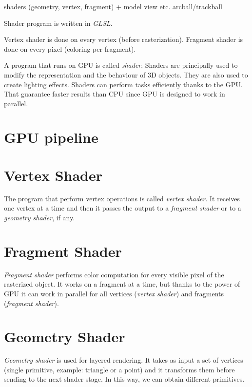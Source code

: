 shaders (geometry, vertex, fragment) + model view etc.
arcball/trackball

Shader program is written in \textit{GLSL}.

Vertex shader is done on every vertex (before rasterization).
Fragment shader is done on every pixel (coloring per fragment).

A program that runs on GPU is called \textit{shader}. Shaders are principally used to modify the representation and the behaviour of 3D objects. They are also used to create lighting effects.  Shaders can perform tasks efficiently thanks to the GPU. That guarantee faster results than CPU since GPU is designed to work in parallel.

\section{GPU pipeline}


\section{Vertex Shader}
The program that perform vertex operations is called \textit{vertex shader}. It receives one vertex at a time and then it passes the output to a \textit{fragment shader} or to a \textit{geometry shader}, if any.

\section{Fragment Shader}
\textit{Fragment shader} performs color computation for every visible pixel of the rasterized object. It works on a fragment at a time, but thanks to the power of GPU it can work in parallel for all vertices (\textit{vertex shader}) and fragments (\textit{fragment shader}).

\section{Geometry Shader}
\textit{Geometry shader} is used for layered rendering. It takes as input a set of vertices (single primitive, example: triangle or a point) and it transforms them before sending to the next shader stage. In this way, we can obtain different primitives.

